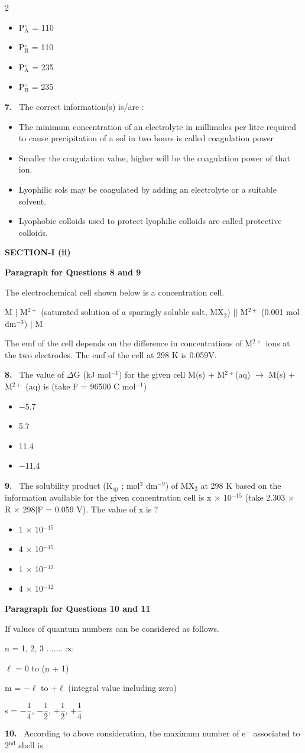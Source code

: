 \documentclass[10pt]{extarticle}
\newcommand{\sect}[1]{\par\smallskip\noindent\textbf{#1}\par}
\newcommand{\qn}[1]{\par\smallskip\noindent\textbf{#1.}~}
\newcommand{\paraq}[2]{\par\smallskip\noindent\textbf{Paragraph for Questions #1 and #2}\par}
\newenvironment{qoptions}{\begin{itemize}[leftmargin=1.8em,itemsep=1pt,topsep=2pt,label={}]}{\end{itemize}}
\newcommand{\opt}[2]{\item[(#1)] #2}
\begin{document}
\begin{multicols}{2}
\begin{qoptions}
\opt{A}{P$^\circ_\mathrm A$ = 110}
\opt{B}{P$^\circ_\mathrm B$ = 110}
\opt{C}{P$^\circ_\mathrm A$ = 235}
\opt{D}{P$^\circ_\mathrm B$ = 235}
\end{qoptions}
\qn{7} The correct information(s) is/are :
\begin{qoptions}
\opt{A}{The minimum concentration of an electrolyte in millimoles per litre required to cause precipitation of a sol in two hours is called coagulation power}
\opt{B}{Smaller the coagulation value, higher will be the coagulation power of that ion.}
\opt{C}{Lyophilic sols may be coagulated by adding an electrolyte or a suitable solvent.}
\opt{D}{Lyophobic colloids used to protect lyophilic colloids are called protective colloids.}
\end{qoptions}
\sect{SECTION-I (ii)}
\paraq{8}{9}
The electrochemical cell shown below is a concentration cell.\par
M $|$ M$^{2+}$ (saturated solution of a sparingly soluble salt, MX$_2$) $||$ M$^{2+}$ (0.001 mol dm$^{-3}$) $|$ M\par
The emf of the cell depends on the difference in concentrations of M$^{2+}$ ions at the two electrodes. The emf of the cell at 298 K is 0.059V.
\qn{8} The value of $\Delta$G (kJ mol$^{-1}$) for the given cell M(s) + M$^{2+}$(aq) $\longrightarrow$ M(s) + M$^{2+}$ (aq) is (take F = 96500 C mol$^{-1}$)
\begin{qoptions}
\opt{A}{$-$5.7}
\opt{B}{5.7}
\opt{C}{11.4}
\opt{D}{$-$11.4}
\end{qoptions}
\qn{9} The solubility product (K$_\mathrm{sp}$ ; mol$^3$ dm$^{-9}$) of MX$_2$ at 298 K based on the information available for the given concentration cell is x $\times$ 10$^{-15}$ (take 2.303 $\times$ R $\times$ 298$|$F = 0.059 V). The value of x is ?
\begin{qoptions}
\opt{A}{1 $\times$ 10$^{-15}$}
\opt{B}{4 $\times$ 10$^{-15}$}
\opt{C}{1 $\times$ 10$^{-12}$}
\opt{D}{4 $\times$ 10$^{-12}$}
\end{qoptions}
\paraq{10}{11}
If values of quantum numbers can be considered as follows.\par
n = 1, 2, 3 ....... $\infty$\par
$\ell$ = 0 to (n + 1)\par
m = $-\ell$ to +$\ell$ (integral value including zero)\par
s = $-\dfrac14$, $-\dfrac12$, +$\dfrac12$, +$\dfrac14$
\qn{10} According to above consideration, the maximum number of e$^-$ associated to 2$^{\mathrm{nd}}$ shell is :

\end{multicols}
\end{document}
